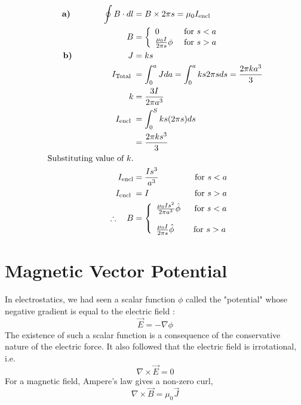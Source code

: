 \begin{answer}
	\begin{align*}
	\textbf{a)}\hspace{1cm}\quad\oint B \cdot d l&=B \times 2 \pi s=\mu_{0} I_{\text {encl }}\\
	B&=\left\{\begin{array}{ll}0 & \text { for } s<a \\ \frac{\mu _0 I}{2 \pi s} \phi & \text { for } s>a\end{array}\right.\\
	\textbf{b)}\hspace{2cm}\quad J&=k s\\
	I_{\text {Total }}&=\int_{0}^{a} J d a=\int_{0}^{a} k s 2 \pi s d s=\frac{2 \pi k a^{3}}{3}\\
	k&=\frac{3 I}{2 \pi a^{3}}\\
	I_{\text {encl }}&=\int_{0}^{S} k s(2 \pi s) d s\\
	&=\frac{2 \pi k s^{3}}{3}\\
	\text{Substituting value of $k$.}\\
	I_{\text{encl}} &=\frac{I s^{3}}{a^{3}}\hspace{1.4cm}\text{ for } s<a\\
	I_{\text {encl }}&=I \hspace{1.8cm}\text{ for } s>a\\
	\therefore \quad B&=\left\{\begin{array}{l}\frac{\mu_{0} I s^{2}}{2 \pi a^{3}} \hat{\phi}\ \quad \text { for } s<a \\\\ \frac{\mu_{0} I}{2\pi s} \hat{\phi}\qquad \text { for } s>a\end{array}\right.
	\end{align*}
\end{answer}
\section{Magnetic Vector Potential}
In electrostatics, we had seen  a scalar function $\phi$ called the "potential"
whose negative gradient is equal to the electric field : 
\begin{equation*}
\vec{E}=-\nabla \phi
\end{equation*}
 The existence of such a scalar function is a consequence of the conservative nature of the electric force. It also followed that the electric field is irrotational, i.e.
 \begin{equation*}
\nabla \times \vec{E}=0
 \end{equation*}
For a magnetic field, Ampere's law gives a non-zero curl,
\begin{equation*}
\nabla\times \vec{B}=\mu_{0} \vec{J}
\end{equation*}

